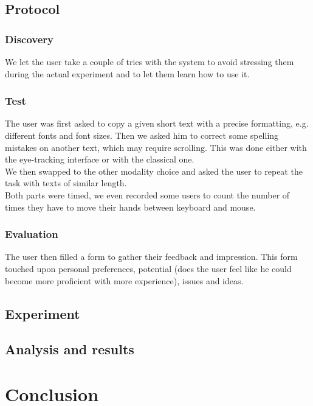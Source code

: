 \documentclass[12pt, a4paper, twoside]{article}
\begin{document}
\subsection{Protocol}

\subsubsection{Discovery}
We let the user take a couple of tries with the system to avoid stressing them during the actual experiment and to let them learn how to use it. 

\subsubsection{Test}
The user was first asked to copy a given short text with a precise formatting, e.g. different fonts and font sizes. Then we asked him to correct some spelling mistakes on another text, which may require scrolling. This was done either with the eye-tracking interface or with the classical one. \\
We then swapped to the other modality choice and asked the user to repeat the task with texts of similar length. \\
Both parts were timed, we even recorded some users to count the number of times they have to move their hands between keyboard and mouse. 

\subsubsection{Evaluation}
The user then filled a form to gather their feedback and impression. This form touched upon personal preferences, potential (does the user feel like he could become more proficient with more experience), issues and ideas. 

\subsection{Experiment}

\subsection{Analysis and results}

\section{Conclusion}
 
\end{document}

